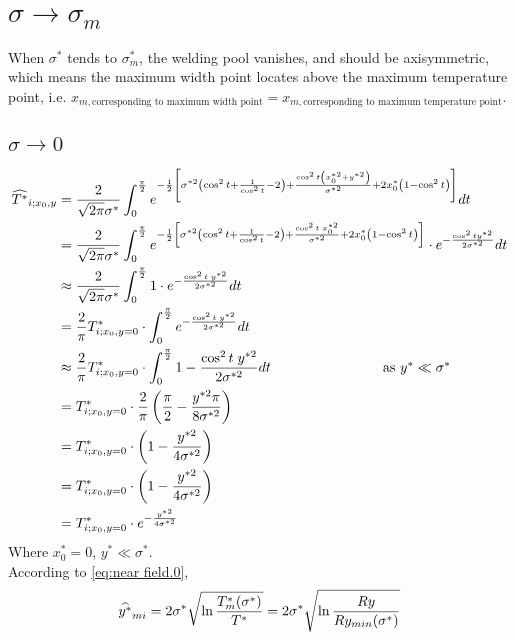 \documentclass[review, 1p, number, sort&compress,table]{elsarticle}
\begin{document}
	\section{$\sigma\rightarrow{\sigma_m}$}
	When $\sigma^{*}$ tends to $\sigma^{*}_m$, the welding pool vanishes, and should be axisymmetric, which means the maximum width point locates above the maximum temperature point, i.e. $x_{m,\mbox{corresponding to maximum width point}}=x_{m,\mbox{corresponding to maximum temperature point}}$.
	\subsection{$\sigma\rightarrow{0}$}
		\begin{align}
		\nonumber
			\widehat{T^{*}}_{\uppercase\expandafter{\romannumeral1};x_0,y}&=\frac{2}{\sqrt{2\pi}\sigma^*}\int_{0}^{\frac{\pi}{2}} e^{-\frac{1}{2}\left[\sigma^{*2}\left(\cos^2{t}+\frac{1}{\cos^2{t}}-2 \right)+\frac{\cos^2{t}\left(x^{*2}_0+y^{*2}\right) }{\sigma^{*2}}+2x^{*}_0\left( 1-\cos^2{t} \right)\right] }dt
			\\ \nonumber
			&=\frac{2}{\sqrt{2\pi}\sigma^*}\int_{0}^{\frac{\pi}{2}} e^{-\frac{1}{2}\left[\sigma^{*2}\left(\cos^2{t}+\frac{1}{\cos^2{t}}-2 \right)+\frac{\cos^2{t}\;x^{*2}_0 }{\sigma^{*2}}+2x^{*}_0\left( 1-\cos^2{t} \right)\right]} \cdot e^{-\frac{\cos^2{t}y^{*2}}{2\sigma^{*2}}}dt
			\\ \nonumber	
			&\approx \frac{2}{\sqrt{2\pi}\sigma^*}\int_{0}^{\frac{\pi}{2}} 1 \cdot e^{-\frac{\cos^2{t} \; y^{*2}}{2\sigma^{*2}}}dt
			 \\ \nonumber
			&=\frac{2}{\pi}T^{*}_{\uppercase\expandafter{\romannumeral1};x_0,y=0} \cdot \int_{0}^{\frac{\pi}{2}} e^{-\frac{\cos^2{t} \; y^{*2}}{2\sigma^{*2}}}dt
			\\ \nonumber
			&\approx \frac{2}{\pi}T^{*}_{\uppercase\expandafter{\romannumeral1};x_0,y=0} \cdot \int_{0}^{\frac{\pi}{2}} 1-\frac{\cos^2{t} \; y^{*2}}{2\sigma^{*2}}dt \qquad \qquad \qquad \qquad \mbox{as $y^{*}\ll \sigma^{*}$}
			\\  \nonumber
			&=	 T^{*}_{\uppercase\expandafter{\romannumeral1};x_0,y=0}\cdot
			 \frac{2}{\pi}\left(\frac{\pi}{2}-\frac{y^{*2}\pi}{8\sigma^{*2}}\right)
			\\ \nonumber
			&=	 T^{*}_{\uppercase\expandafter{\romannumeral1};x_0,y=0}\cdot
			\left(1-\frac{y^{*2}}{4\sigma^{*2}}\right)
			\\ \nonumber
			&=	 T^{*}_{\uppercase\expandafter{\romannumeral1};x_0,y=0}\cdot
			\left(1-\frac{y^{*2}}{4\sigma^{*2}}\right)
			\\ 
			&=	 T^{*}_{\uppercase\expandafter{\romannumeral1};x_0,y=0}\cdot
			e^{-\frac{y^{*2}}{4\sigma^{*2}}} \label{eq:near field.0}
		\end{align}
	Where $x_0^{*}=0$, $y^{*}\ll \sigma^{*}$.  \\
	According to \autoref{eq:near field.0}, 
	\begin{equation} \label{eq:Sm.0}
		\widehat{y^{*}}_{m\uppercase\expandafter{\romannumeral1}} = 2\sigma^{*}\sqrt{\ln{\frac{T^{*}_m(\sigma^{*})}{T^{*}}}}=2\sigma^{*}\sqrt{\ln{\frac{Ry}{Ry_{min}(\sigma^{*})}}}
	\end{equation}
\end{document}
